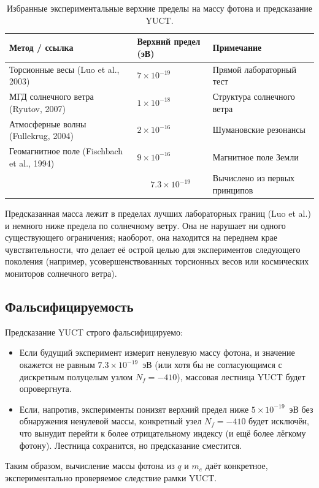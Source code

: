 \documentclass[11pt,a4paper]{article}
\begin{document}
	\begin{table}[H]
		\centering
		\footnotesize
		\caption{Избранные экспериментальные верхние пределы на массу фотона и предсказание YUCT.}
		\label{tab:photon_limits}
		\begin{tabular}{p{5.2cm}p{2.2cm}p{3.6cm}}
			\toprule
			\textbf{Метод / ссылка} & \textbf{Верхний предел (эВ)} & \textbf{Примечание} \\
			\midrule
			Торсионные весы (Luo et al., 2003) & \(7\times10^{-19}\) & Прямой лабораторный тест \\
			МГД солнечного ветра (Ryutov, 2007) & \(1\times10^{-18}\) & Структура солнечного ветра \\
			Атмосферные волны (Fullekrug, 2004) & \(2\times10^{-16}\) & Шумановские резонансы \\
			Геомагнитное поле (Fischbach et al., 1994) & \(9\times10^{-16}\) & Магнитное поле Земли \\
			\addlinespace
			\multicolumn{1}{c}{\textbf{Предсказание YUCT}} & \multicolumn{1}{c}{\(7.3\times10^{-19}\)} & Вычислено из первых принципов \\
			\bottomrule
		\end{tabular}
	\end{table}
	
	Предсказанная масса лежит в пределах лучших лабораторных границ (Luo et al.) и немного ниже предела по солнечному ветру.
	Она не нарушает ни одного существующего ограничения; наоборот, она находится на переднем крае чувствительности,
	что делает её острой целью для экспериментов следующего поколения (например, усовершенствованных торсионных весов
	или космических мониторов солнечного ветра).
	
	\subsection{Фальсифицируемость}
	
	Предсказание YUCT строго фальсифицируемо:
	\begin{itemize}
		\item Если будущий эксперимент измерит ненулевую массу фотона, и значение окажется не равным \(7.3\times10^{-19}\)~эВ
		(или хотя бы не согласующимся с дискретным полуцелым узлом \(N_f = -410\)), массовая лестница YUCT будет опровергнута.
		\item Если, напротив, эксперименты понизят верхний предел ниже \(5\times10^{-19}\)~эВ без обнаружения ненулевой массы,
		конкретный узел \(N_f = -410\) будет исключён, что вынудит перейти к более отрицательному индексу (и ещё более лёгкому фотону).
		Лестница сохранится, но предсказание сместится.
	\end{itemize}
	Таким образом, вычисление массы фотона из \(q\) и \(m_e\) даёт конкретное, экспериментально проверяемое следствие рамки YUCT.
	
\end{document}
